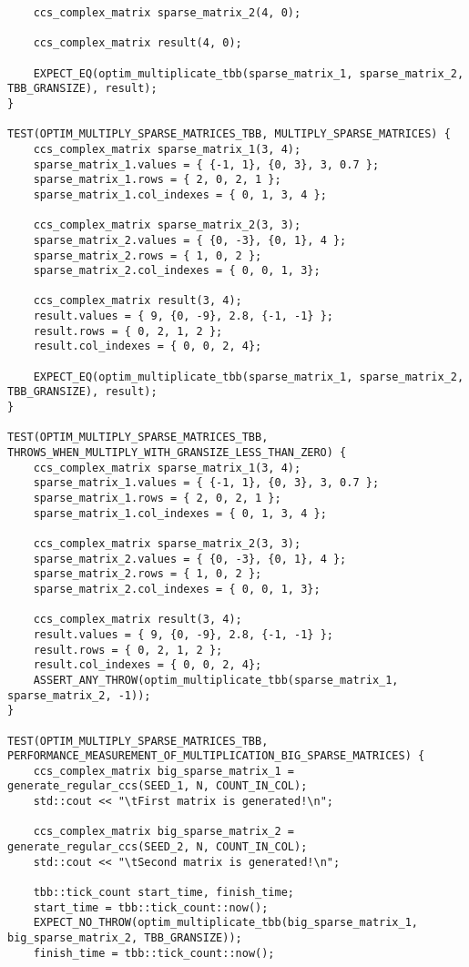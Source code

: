 \documentclass{report}
\begin{document}
\begin{lstlisting}
    ccs_complex_matrix sparse_matrix_2(4, 0);

    ccs_complex_matrix result(4, 0);

    EXPECT_EQ(optim_multiplicate_tbb(sparse_matrix_1, sparse_matrix_2, TBB_GRANSIZE), result);
}

TEST(OPTIM_MULTIPLY_SPARSE_MATRICES_TBB, MULTIPLY_SPARSE_MATRICES) {
    ccs_complex_matrix sparse_matrix_1(3, 4);
    sparse_matrix_1.values = { {-1, 1}, {0, 3}, 3, 0.7 };
    sparse_matrix_1.rows = { 2, 0, 2, 1 };
    sparse_matrix_1.col_indexes = { 0, 1, 3, 4 };

    ccs_complex_matrix sparse_matrix_2(3, 3);
    sparse_matrix_2.values = { {0, -3}, {0, 1}, 4 };
    sparse_matrix_2.rows = { 1, 0, 2 };
    sparse_matrix_2.col_indexes = { 0, 0, 1, 3};

    ccs_complex_matrix result(3, 4);
    result.values = { 9, {0, -9}, 2.8, {-1, -1} };
    result.rows = { 0, 2, 1, 2 };
    result.col_indexes = { 0, 0, 2, 4};

    EXPECT_EQ(optim_multiplicate_tbb(sparse_matrix_1, sparse_matrix_2, TBB_GRANSIZE), result);
}

TEST(OPTIM_MULTIPLY_SPARSE_MATRICES_TBB, THROWS_WHEN_MULTIPLY_WITH_GRANSIZE_LESS_THAN_ZERO) {
    ccs_complex_matrix sparse_matrix_1(3, 4);
    sparse_matrix_1.values = { {-1, 1}, {0, 3}, 3, 0.7 };
    sparse_matrix_1.rows = { 2, 0, 2, 1 };
    sparse_matrix_1.col_indexes = { 0, 1, 3, 4 };

    ccs_complex_matrix sparse_matrix_2(3, 3);
    sparse_matrix_2.values = { {0, -3}, {0, 1}, 4 };
    sparse_matrix_2.rows = { 1, 0, 2 };
    sparse_matrix_2.col_indexes = { 0, 0, 1, 3};

    ccs_complex_matrix result(3, 4);
    result.values = { 9, {0, -9}, 2.8, {-1, -1} };
    result.rows = { 0, 2, 1, 2 };
    result.col_indexes = { 0, 0, 2, 4};
    ASSERT_ANY_THROW(optim_multiplicate_tbb(sparse_matrix_1, sparse_matrix_2, -1));
}

TEST(OPTIM_MULTIPLY_SPARSE_MATRICES_TBB, PERFORMANCE_MEASUREMENT_OF_MULTIPLICATION_BIG_SPARSE_MATRICES) {
    ccs_complex_matrix big_sparse_matrix_1 = generate_regular_ccs(SEED_1, N, COUNT_IN_COL);
    std::cout << "\tFirst matrix is generated!\n";

    ccs_complex_matrix big_sparse_matrix_2 = generate_regular_ccs(SEED_2, N, COUNT_IN_COL);
    std::cout << "\tSecond matrix is generated!\n";

    tbb::tick_count start_time, finish_time;
    start_time = tbb::tick_count::now();
    EXPECT_NO_THROW(optim_multiplicate_tbb(big_sparse_matrix_1, big_sparse_matrix_2, TBB_GRANSIZE));
    finish_time = tbb::tick_count::now();


\end{lstlisting}
\end{document}
